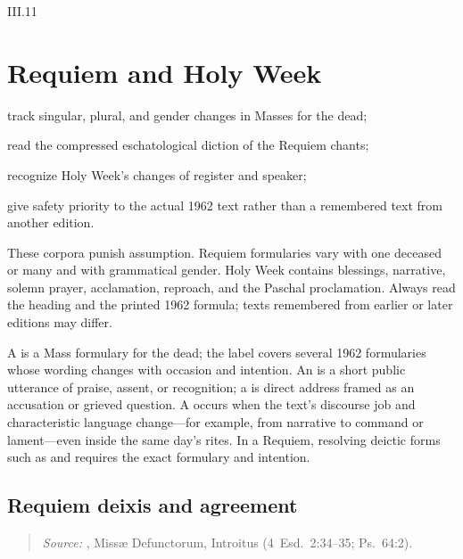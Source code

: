 \begin{courseunit}{III.11}
\chapter{Requiem and Holy Week}

\begin{learningobjectives}
  \item track singular, plural, and gender changes in Masses for the dead;
  \item read the compressed eschatological diction of the Requiem chants;
  \item recognize Holy Week's changes of register and speaker;
  \item give safety priority to the actual 1962 text rather than a remembered text from another edition.
\end{learningobjectives}

These corpora punish assumption. Requiem formularies vary with one deceased or
many and with grammatical gender. Holy Week contains blessings, narrative,
solemn prayer, acclamation, reproach, and the Paschal proclamation. Always read
the heading and the printed 1962 formula; texts remembered from earlier or later
editions may differ.

A  is a Mass formulary for the dead; the label covers
several 1962 formularies whose wording changes with occasion and intention.
An  is a short public utterance of praise, assent, or
recognition; a  is direct address framed as an accusation or
grieved question. A  occurs when the text's discourse
job and characteristic language change---for example, from narrative to
command or lament---even inside the same day's rites. In a Requiem, resolving
deictic forms such as  and  requires the exact
formulary and intention.

\section{Requiem deixis and agreement}

\begin{quote}

\emph{Source:} \Missal, Missæ Defunctorum, Introitus
(4~Esd.~2:34--35; Ps.~64:2).
\end{quote}


\end{courseunit}
